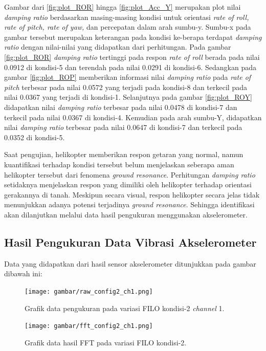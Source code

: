 Gambar dari \ref{fig:plot_ROR} hingga \ref{fig:plot_Acc_Y} merupakan plot nilai \textit{damping ratio} berdasarkan masing-masing kondisi untuk orientasi \textit{rate of roll, rate of pitch, rate of yaw,} dan percepatan dalam arah sumbu-y. Sumbu-x pada gambar tersebut merupakan keterangan pada kondisi ke-berapa terdapat \textit{damping ratio} dengan nilai-nilai yang didapatkan dari perhitungan. Pada gambar \ref{fig:plot_ROR} \textit{damping ratio} tertinggi pada respon \textit{rate of roll} berada pada nilai 0.0912 di kondisi-5 dan terendah pada nilai 0.0291 di kondisi-6. Sedangkan pada gambar \ref{fig:plot_ROP} memberikan informasi nilai \textit{damping ratio} pada \textit{rate of pitch} terbesar pada nilai 0.0572 yang terjadi pada kondisi-8 dan terkecil pada nilai 0.0367 yang terjadi di kondisi-1. Selanjutnya pada gambar \ref{fig:plot_ROY} didapatkan nilai \textit{damping ratio} terbesar pada nilai 0.0478 di kondisi-7 dan terkecil pada nilai 0.0367 di kondisi-4. Kemudian pada arah sumbu-Y, didapatkan nilai \textit{damping ratio} terbesar pada nilai 0.0647 di kondisi-7 dan terkecil pada 0.0352 di kondisi-5.  

Saat pengujian, helikopter memberikan respon getaran yang normal, namun kuantifikasi terhadap kondisi tersebut belum menjelaskan seberapa aman helikopter tersebut dari fenomena \textit{ground resonance}. Perhitungan \textit{damping ratio} setidaknya menjelaskan respon yang dimiliki oleh helikopter terhadap orientasi gerakannya di tanah. Meskipun secara visual, respon helikopter secara jelas tidak menunjukkan adanya potensi terjadinya \textit{ground resonance}. Sehingga identifikasi akan dilanjutkan melalui data hasil pengukuran menggunakan akselerometer.

\subsection{Hasil Pengukuran Data Vibrasi Akselerometer}

Data yang didapatkan dari hasil sensor akselerometer ditunjukkan pada gambar dibawah ini:

\begin{figure}[h]
	\centering
	\texttt{[image: gambar/raw\_config2\_ch1.png]}
	\caption{Grafik data pengukuran pada variasi FILO kondisi-2 \textit{channel} 1.}
	\label{fig:raw_config2_FILO}
\end{figure}

\begin{figure}[H]
	\centering
	\texttt{[image: gambar/fft\_config2\_ch1.png]}
	\caption{Grafik data hasil FFT pada variasi FILO kondisi-2.}
	\label{fig:fft_config2_FILO}
\end{figure}

